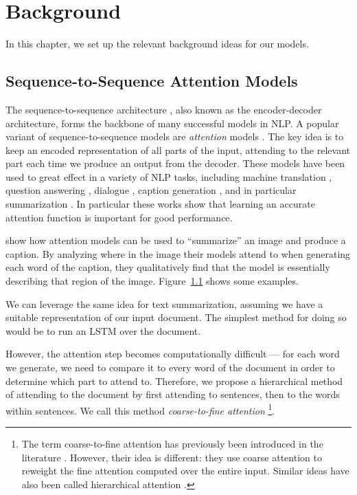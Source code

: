 \documentclass[11pt]{report}
\begin{document}


\chapter{Background}

In this chapter, we set up the relevant background ideas for our models.

\section{Sequence-to-Sequence Attention Models}

The sequence-to-sequence architecture \citep{sutskever2014sequence}, also known as the encoder-decoder architecture, forms the backbone of many successful models in NLP. A popular variant of sequence-to-sequence models are \emph{attention} models \citep{bahdanau2014neural}. The key idea is to keep an encoded representation of all parts of the input, attending to the relevant part each time we produce an output from the decoder.
These models have been used to great effect in a variety of NLP tasks, including machine translation \citep{sutskever2014sequence, bahdanau2014neural}, question answering \citep{Hermann2015}, dialogue \citep{li2016persona}, caption generation \citep{xu2015captioning}, and in particular summarization \citep{rush2015neural}. In particular these works show that learning an accurate attention function is important for good performance. %

\citet{xu2015captioning} show how attention models can be used to ``summarize'' an image and produce a caption. 
By analyzing where in the image their models attend to when generating each word of the caption, they qualitatively find that the model is essentially describing that region of the image. 
Figure~\ref{} shows some examples.


We can leverage the same idea for text summarization, assuming we have a suitable representation of our input document. The simplest method for doing so would be to run an LSTM over the document.

However, the attention step becomes computationally difficult --- for each word we generate, we need to compare it to every word of the document in order to determine which part to attend to. Therefore, we propose a hierarchical method of attending to the document by first attending to sentences, then to the words within sentences. We call this method \emph{coarse-to-fine attention}
\footnote{The term coarse-to-fine attention has previously been introduced in the literature \citep{mei2016}. However, their idea is different: they use coarse attention to reweight the fine attention computed over the entire input. Similar ideas have also been called hierarchical attention \citep{nallapati2016seq2seq}.}.
\end{document}
